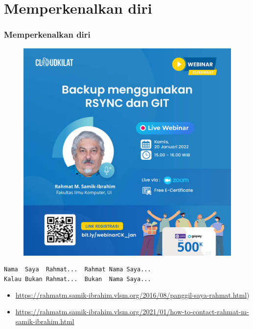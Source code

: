 \documentclass[xcolor=table, notheorems, hyperref={pdfpagelabels=false}]{beamer}
\begin{document}
\section{Memperkenalkan diri}
\begin{frame}[fragile]
\frametitle{Memperkenalkan diri}
\begin{figure}
\includegraphics[width=0.48\linewidth]{JPG-012}
\end{figure}
\begin{lstlisting}[basicstyle=\ttfamily\large]
Nama  Saya  Rahmat...  Rahmat Nama Saya...
Kalau Bukan Rahmat...  Bukan  Nama Saya...
\end{lstlisting}
{\tiny
\begin{itemize}
\item \url{https://rahmatm.samik-ibrahim.vlsm.org/2016/08/panggil-saya-rahmat.html})
\item \url{https://rahmatm.samik-ibrahim.vlsm.org/2021/01/how-to-contact-rahmat-m-samik-ibrahim.html}
\end{itemize}
}
\end{frame}

\end{document}
